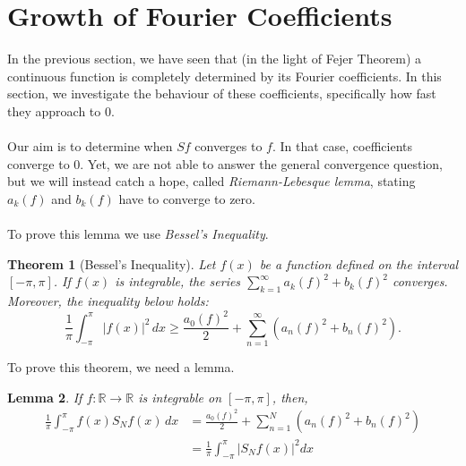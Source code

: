 \documentclass[12pt]{amsart}
\newtheorem{theorem}{Theorem}[section]
\newtheorem{lemma}[theorem]{Lemma}
\theoremstyle{definition}
\begin{document}
\section{Growth of Fourier Coefficients}


In the previous section, we have seen that (in the light of Fejer Theorem) a continuous function is completely determined by its Fourier coefficients\footnotemark{}. In this section, we investigate the behaviour of these coefficients, specifically how fast they approach to $0$. \paragraph{}
    Our aim is to determine when $Sf$ converges to $f$. In that case, coefficients converge to 0. Yet, we are not able to answer the general convergence question, but we will instead catch a hope, called \textit{Riemann-Lebesque lemma}, stating $a_k(f)$ and $b_k(f)$ have to converge to zero. \paragraph{}
    To prove this lemma we use \textit{Bessel's Inequality}.


\begin{theorem}[Bessel's Inequality]\label{bassel inequality}
Let $f(x)$ be a function defined on the interval $[-\pi, \pi]$. If $f(x)$ is integrable, the series $\sum_{k=1}^{\infty}a_k(f)^2 + b_k(f)^2$ converges. Moreover, the inequality below holds:
\begin{equation}
    \frac{1}{\pi} \int_{-\pi}^{\pi} |f(x)|^2 \, dx \geq \frac{a_0(f)^2}{2} + \sum_{n=1}^{\infty} \left(a_n(f)^2 + b_n(f)^2\right).
\end{equation}
\end{theorem}


 To prove this theorem, we need a lemma.


 \begin{lemma}\label{lemma needed to prove basels inequality}
     If $f: \mathbb{R} \to \mathbb{R}$ is integrable on $[-\pi, \pi]$, then,
     \begin{equation}
     \begin{aligned}
         \frac{1}{\pi} \int_{-\pi}^{\pi} f(x)S_Nf(x) \, dx
         &= \frac{a_0(f)^2}{2} + \sum_{n=1}^{N} \left(a_n(f)^2 +
         b_n(f)^2\right)\\
         &=  \frac{1}{\pi} \int_{-\pi}^{\pi} |S_Nf(x)|^2  dx
     \end{aligned}
     \end{equation}
 \end{lemma}
\end{document}

